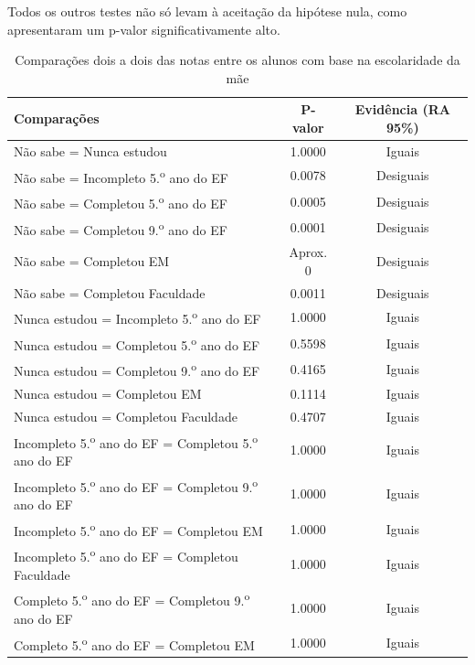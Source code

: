 Todos os outros testes não só levam à aceitação da hipótese nula, como apresentaram um p-valor
significativamente alto.


\newpage
\begin{table}[htb]
    \centering
\caption{\label{tab:esc_mae_notas}Comparações dois a dois das notas entre os alunos com base na escolaridade da mãe}
    \begin{tabular}{lcc}
    \toprule
    Comparações & P-valor & Evidência (RA 95\%)\\
    \midrule \midrule
    Não sabe = Nunca estudou & 1.0000 & Iguais\\
    Não sabe = Incompleto 5.\textsuperscript{o} ano do EF  & 0.0078 & Desiguais\\
    Não sabe = Completou 5.\textsuperscript{o} ano do EF  & 0.0005 & Desiguais\\
    Não sabe = Completou 9.\textsuperscript{o} ano do EF  & 0.0001 & Desiguais\\
    Não sabe = Completou EM & Aprox. 0 & Desiguais\\
    Não sabe = Completou Faculdade & 0.0011 & Desiguais\\
    Nunca estudou = Incompleto 5.\textsuperscript{o} ano do EF  & 1.0000 & Iguais\\
    Nunca estudou = Completou 5.\textsuperscript{o} ano do EF  & 0.5598 & Iguais\\
    Nunca estudou = Completou 9.\textsuperscript{o} ano do EF  & 0.4165 & Iguais\\
    Nunca estudou = Completou EM & 0.1114 & Iguais\\
    Nunca estudou = Completou Faculdade & 0.4707 & Iguais\\
    Incompleto 5.\textsuperscript{o} ano do EF = Completou 5.\textsuperscript{o} ano do EF  & 1.0000 & Iguais\\
    Incompleto 5.\textsuperscript{o} ano do EF = Completou 9.\textsuperscript{o} ano do EF  & 1.0000 & Iguais\\
    Incompleto 5.\textsuperscript{o} ano do EF = Completou EM & 1.0000 & Iguais\\
    Incompleto 5.\textsuperscript{o} ano do EF = Completou Faculdade & 1.0000 & Iguais\\
    Completo 5.\textsuperscript{o} ano do EF = Completou 9.\textsuperscript{o} ano do EF  & 1.0000 & Iguais\\
    Completo 5.\textsuperscript{o} ano do EF = Completou EM & 1.0000 & Iguais\\

\end{tabular}
\end{table}
